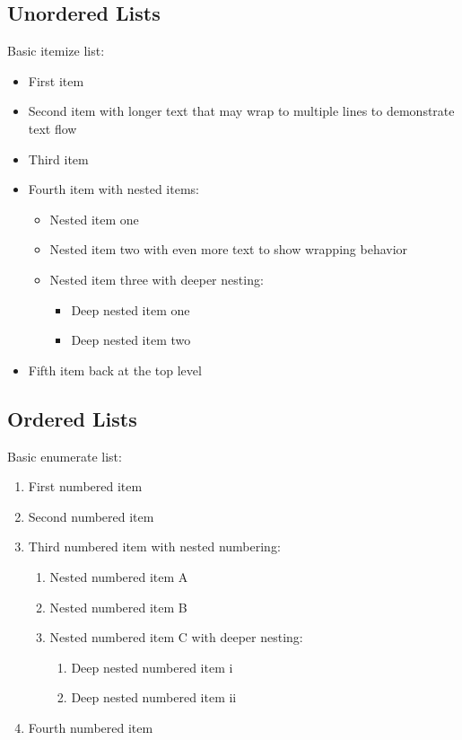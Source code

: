 \documentclass[11pt,letterpaper]{article}
\begin{document}
\subsection{Unordered Lists}

Basic itemize list:
\begin{itemize}
    \item First item
    \item Second item with longer text that may wrap to multiple lines to demonstrate text flow
    \item Third item
    \item Fourth item with nested items:
    \begin{itemize}
        \item Nested item one
        \item Nested item two with even more text to show wrapping behavior
        \item Nested item three with deeper nesting:
        \begin{itemize}
            \item Deep nested item one
            \item Deep nested item two
        \end{itemize}
    \end{itemize}
    \item Fifth item back at the top level
\end{itemize}

\subsection{Ordered Lists}

Basic enumerate list:
\begin{enumerate}
    \item First numbered item
    \item Second numbered item
    \item Third numbered item with nested numbering:
    \begin{enumerate}
        \item Nested numbered item A
        \item Nested numbered item B
        \item Nested numbered item C with deeper nesting:
        \begin{enumerate}
            \item Deep nested numbered item i
            \item Deep nested numbered item ii
        \end{enumerate}
    \end{enumerate}
    \item Fourth numbered item
\end{enumerate}
\end{document}
